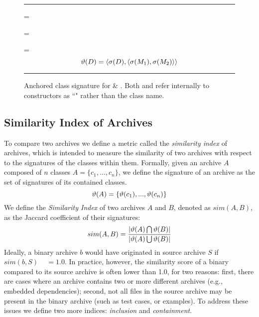 \begin{figure}[htbp]
{
\hrule\vspace{1mm}
\scriptsize
\signature{D}\quad = \\
\signature{M_1} = \\
\signature{M_2} = 
\[\vartheta(D) = \langle \sigma(D), \langle \sigma(M_1),
\sigma(M_2)\rangle \rangle\]
}
\vspace{-4mm}\hrule\vspace{1mm}
  \caption{\small{Anchored class signature for  \& .
Both  and  refer internally to constructors as ``"
rather than the class name.}}
  \label{lst:cSig}
\end{figure}

\subsection{Similarity Index of Archives}
\label{sec:sim}

To compare two archives we define a metric called the \emph{similarity
index} of archives, which is intended to measure the similarity of two
archives with respect to the signatures of the classes within them.
Formally, given  an archive $A$ composed of $n$ classes $A = \{ c_1, ...  ,
c_n\}$, we define the signature of an archive as the set of signatures of
its contained classes.  
\[\vartheta(A) = \{ \vartheta(c_1), ... , \vartheta(c_n)\} \]
We define the \emph{Similarity Index} of two archives $A$ and $B$, denoted as
$sim(A, B)$, as the Jaccard coefficient of their signatures:
\[ sim(A,B) = {{ | \vartheta(A) \bigcap
    \vartheta(B)| }\over{| \ensuremath{\vartheta(A)} \bigcup
    \ensuremath{\vartheta(B)}}| }\]
Ideally, a binary archive $b$ would have originated in source archive $S$
if $sim(b,S)$ ~ $= 1.0$. In practice, however, the similarity score of a binary compared to its
source archive is often lower than 1.0, for two
reasons: first, there are cases where an archive contains two or more
different archives (e.g., embedded dependencies); second, not all files in
the source archive may be present in the binary archive (such as test
cases, or examples). To address these issues we define two more indices:
\emph{inclusion} and \emph{containment}.


